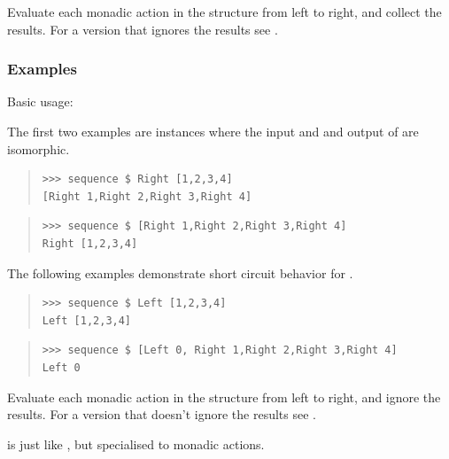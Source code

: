 \begin{haddockdesc}
\item[\begin{tabular}{@{}l}
sequence :: (Traversable t, Monad m) => t (m a) -> m (t a)
\end{tabular}]
{\haddockbegindoc
Evaluate each monadic action in the structure from left to
 right, and collect the results. For a version that ignores the
 results see .\par
\subsubsection*{\textbf{Examples}}
Basic usage:\par
The first two examples are instances where the input and
 and output of  are isomorphic.\par
\begin{quote}
{\haddockverb\begin{verbatim}
>>> sequence $ Right [1,2,3,4]
[Right 1,Right 2,Right 3,Right 4]

\end{verbatim}}
\end{quote}
\begin{quote}
{\haddockverb\begin{verbatim}
>>> sequence $ [Right 1,Right 2,Right 3,Right 4]
Right [1,2,3,4]

\end{verbatim}}
\end{quote}
The following examples demonstrate short circuit behavior
 for .\par
\begin{quote}
{\haddockverb\begin{verbatim}
>>> sequence $ Left [1,2,3,4]
Left [1,2,3,4]

\end{verbatim}}
\end{quote}
\begin{quote}
{\haddockverb\begin{verbatim}
>>> sequence $ [Left 0, Right 1,Right 2,Right 3,Right 4]
Left 0

\end{verbatim}}
\end{quote}}
\end{haddockdesc}
\begin{haddockdesc}
\item[\begin{tabular}{@{}l}
sequence{\char '137} :: (Foldable t, Monad m) => t (m a) -> m ()
\end{tabular}]
{\haddockbegindoc
Evaluate each monadic action in the structure from left to right,
 and ignore the results.  For a version that doesn't ignore the
 results see .\par
{} is just like , but specialised to monadic
 actions.\par}
\end{haddockdesc}
